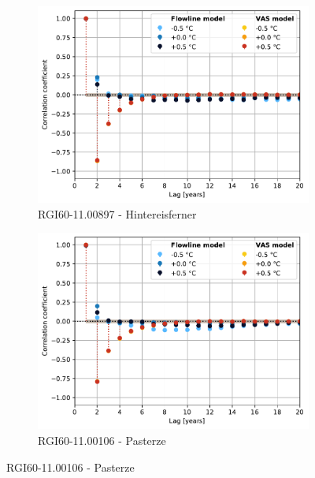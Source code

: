       \begin{figure}[htp]
        \centering
        
        \begin{subfigure}[b]{0.48\textwidth}
          \caption{RGI60-11.00897 - Hintereisferner}
          \label{fig:pacf:hintereisferner}
          \centering
          \includegraphics[width=\textwidth]{../plots/final_plots/pacf/Hintereisferner.pdf}
        \end{subfigure}
        \hfill
        \begin{subfigure}[b]{0.48\textwidth}
          \caption{RGI60-11.00106 - Pasterze}
          \label{fig:pacf:pasterze}
          \centering
          \includegraphics[width=\textwidth]{../plots/final_plots/pacf/Pasterze.pdf}
        \end{subfigure}


\end{figure}
